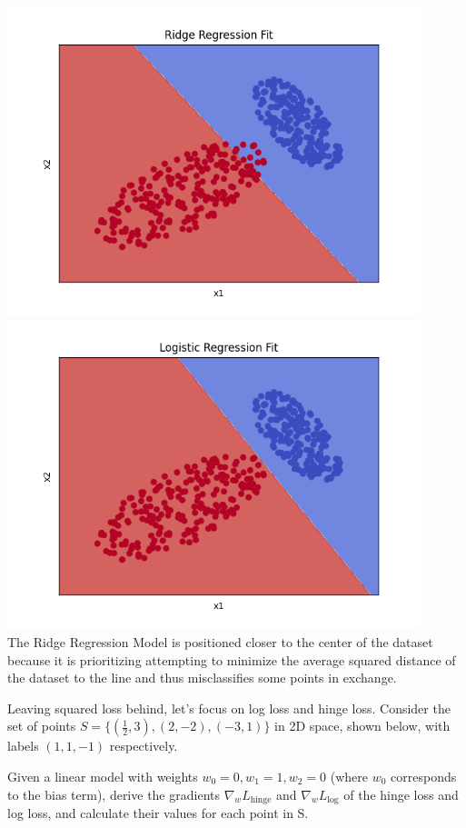 \begin{solution}
  \\
  \includegraphics[width=12cm]{images/P1_B_ridge.png}
  \\
  \includegraphics[width=12cm]{images/P1_B_logistic.png}
  \\
  The Ridge Regression Model is positioned closer to the center of the dataset because it is prioritizing attempting to minimize the average squared distance of the dataset to the line and thus misclassifies some points in exchange.
\end{solution}

\problem[9]
Leaving squared loss behind, let's focus on log loss and hinge loss. Consider the set of points $S = \{(\frac{1}{2}, 3), (2, -2), (-3, 1)\}$ in 2D space, shown below, with labels $(1, 1, -1)$ respectively.

Given a linear model with weights $w_0 = 0, w_1 = 1, w_2 = 0$ (where $w_0$ corresponds to the bias term), derive the gradients $\nabla_{w}L_{\text{hinge}}$ and $\nabla_{w}L_{\text{log}}$ of the hinge loss and log loss, and calculate their values for each point in S.

